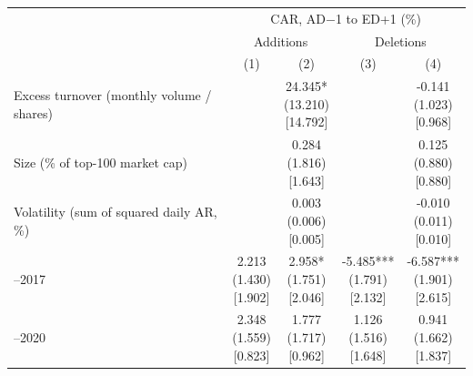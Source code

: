 \begin{threeparttable}
\begingroup
\renewcommand\cellalign{t}
\renewcommand\arraystretch{1}
\setlength{\tabcolsep}{5pt}
\begin{tabular}{@{}lcccc}
\toprule
 & \multicolumn{4}{c}{CAR, AD$-$1 to ED+1 (\%)} \\
\cmidrule(lr){2-5}
 & \multicolumn{2}{c}{Additions} & \multicolumn{2}{c}{Deletions} \\
\cmidrule(lr){2-3} \cmidrule(lr){4-5}
 & (1) & (2) & (3) & (4) \\
\midrule
\addlinespace[1ex]
Excess turnover (monthly volume / shares) &  & \makecell{24.345* \\ (13.210) \\{}[14.792]} &  & \makecell{-0.141 \\ (1.023) \\{}[0.968]} \\
\addlinespace[0.25ex]
\addlinespace[0.25ex]
Size (\% of top-100 market cap) &  & \makecell{0.284 \\ (1.816) \\{}[1.643]} &  & \makecell{0.125 \\ (0.880) \\{}[0.880]} \\
\addlinespace[0.25ex]
\addlinespace[0.25ex]
Volatility (sum of squared daily AR, \%) &  & \makecell{0.003 \\ (0.006) \\{}[0.005]} &  & \makecell{-0.010 \\ (0.011) \\{}[0.010]} \\
\addlinespace[0.25ex]
\addlinespace[0.25ex]
2013–2017 & \makecell{2.213 \\ (1.430) \\{}[1.902]} & \makecell{2.958* \\ (1.751) \\{}[2.046]} & \makecell{-5.485*** \\ (1.791) \\{}[2.132]} & \makecell{-6.587*** \\ (1.901) \\{}[2.615]} \\
\addlinespace[0.25ex]
\addlinespace[0.25ex]
2018–2020 & \makecell{2.348 \\ (1.559) \\{}[0.823]} & \makecell{1.777 \\ (1.717) \\{}[0.962]} & \makecell{1.126 \\ (1.516) \\{}[1.648]} & \makecell{0.941 \\ (1.662) \\{}[1.837]} \\

\end{tabular}
\end{threeparttable}
